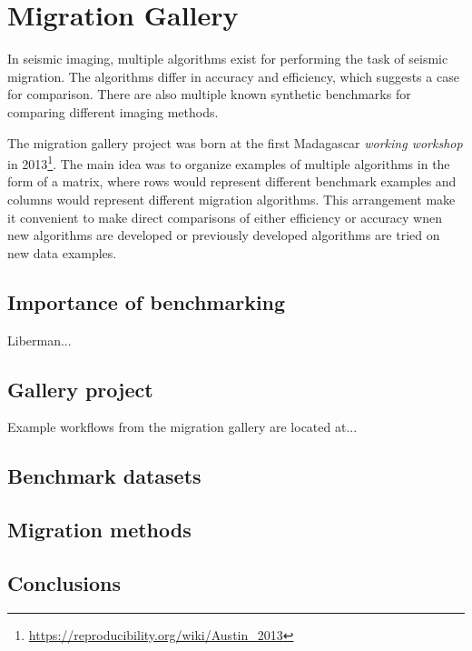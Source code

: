 \chapter{Migration Gallery}

In seismic imaging, multiple algorithms exist for performing the task
of seismic migration. The algorithms differ in accuracy and
efficiency, which suggests a case for comparison. There are also
multiple known synthetic benchmarks for comparing different imaging methods.

The migration gallery project was born at the first Madagascar
\emph{working workshop} in
2013\footnote{\url{https://reproducibility.org/wiki/Austin_2013}}. The
main idea was to organize examples of multiple algorithms in the form
of a matrix, where rows would represent different benchmark examples
and columns would represent different migration algorithms. This
arrangement make it convenient to make direct comparisons of either
efficiency or accuracy wnen new algorithms are developed or previously
developed algorithms are tried on new data examples.

\section{Importance of benchmarking}

Liberman...

\section{Gallery project}

Example workflows from the migration gallery are located at...

\section{Benchmark datasets}

\section{Migration methods}

\section{Conclusions}

